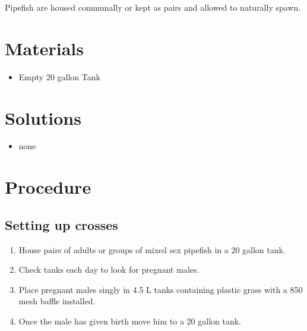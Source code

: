 \documentclass[
  letterpaper,
  DIV=11,
  numbers=noendperiod]{scrreprt}
\providecommand{\tightlist}{%
  \setlength{\itemsep}{0pt}\setlength{\parskip}{0pt}}\usepackage{longtable,booktabs,array}
\begin{document}
\begin{tcolorbox}[enhanced jigsaw, rightrule=.15mm, title=\textcolor{quarto-callout-note-color}{\faInfo}\hspace{0.5em}{NOTES}, titlerule=0mm, opacitybacktitle=0.6, toprule=.15mm, bottomrule=.15mm, opacityback=0, left=2mm, colframe=quarto-callout-note-color-frame, breakable, coltitle=black, colback=white, colbacktitle=quarto-callout-note-color!10!white, bottomtitle=1mm, leftrule=.75mm, toptitle=1mm, arc=.35mm]

Pipefish are housed communally or kept as pairs and allowed to naturally
spawn.

\end{tcolorbox}

\hypertarget{materials-55}{%
\section{Materials}\label{materials-55}}

\begin{itemize}
\tightlist
\item
  Empty 20 gallon Tank
\end{itemize}

\hypertarget{solutions-46}{%
\section{Solutions}\label{solutions-46}}

\begin{itemize}
\tightlist
\item
  none
\end{itemize}

\hypertarget{procedure-55}{%
\section{Procedure}\label{procedure-55}}

\hypertarget{setting-up-crosses}{%
\subsection{Setting up crosses}\label{setting-up-crosses}}

\begin{enumerate}
\def\labelenumi{\arabic{enumi}.}
\tightlist
\item
  House pairs of adults or groups of mixed sex pipefish in a 20 gallon
  tank.
\item
  Check tanks each day to look for pregnant males.
\item
  Place pregnant males singly in 4.5 L tanks containing plastic grass
  with a 850 mesh baffle installed.
\item
  Once the male has given birth move him to a 20 gallon tank.
\end{enumerate}
\end{document}
